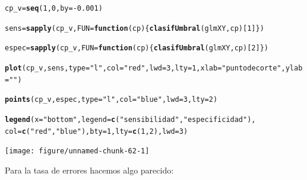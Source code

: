 \documentclass[10pt,a4paper]{article}\usepackage[]{graphicx}\usepackage[]{color}
\makeatletter
\newcommand{\hlnum}[1]{\textcolor[rgb]{0.686,0.059,0.569}{#1}}%
\newcommand{\hlstr}[1]{\textcolor[rgb]{0.192,0.494,0.8}{#1}}%
\newcommand{\hlopt}[1]{\textcolor[rgb]{0,0,0}{#1}}%
\newcommand{\hlstd}[1]{\textcolor[rgb]{0.345,0.345,0.345}{#1}}%
\newcommand{\hlkwa}[1]{\textcolor[rgb]{0.161,0.373,0.58}{\textbf{#1}}}%
\newcommand{\hlkwb}[1]{\textcolor[rgb]{0.69,0.353,0.396}{#1}}%
\newcommand{\hlkwc}[1]{\textcolor[rgb]{0.333,0.667,0.333}{#1}}%
\newcommand{\hlkwd}[1]{\textcolor[rgb]{0.737,0.353,0.396}{\textbf{#1}}}%
\newenvironment{kframe}{%
 \def\at@end@of@kframe{}%
 \ifinner\ifhmode%
  \def\at@end@of@kframe{\end{minipage}}%
  \begin{minipage}{\columnwidth}%
 \fi\fi%
 \def\FrameCommand##1{\hskip\@totalleftmargin \hskip-\fboxsep
 \colorbox{shadecolor}{##1}\hskip-\fboxsep
     \hskip-\linewidth \hskip-\@totalleftmargin \hskip\columnwidth}%
 \MakeFramed {\advance\hsize-\width
   \@totalleftmargin\z@ \linewidth\hsize
   \@setminipage}}%
 {\par\unskip\endMakeFramed%
 \at@end@of@kframe}
\newenvironment{knitrout}{}{} %
\makeatother
\begin{document}
\begin{knitrout}
\color{fgcolor}\begin{kframe}
\begin{alltt}
\hlstd{cp_v} \hlkwb{=} \hlkwd{seq}\hlstd{(}\hlnum{1}\hlstd{,} \hlnum{0}\hlstd{,} \hlkwc{by} \hlstd{=} \hlopt{-}\hlnum{0.001}\hlstd{)}

\hlstd{sens} \hlkwb{=} \hlkwd{sapply}\hlstd{(cp_v,} \hlkwc{FUN} \hlstd{=} \hlkwa{function}\hlstd{(}\hlkwc{cp}\hlstd{)\{}\hlkwd{clasifUmbral}\hlstd{(glmXY, cp)[}\hlnum{1}\hlstd{]\})}

\hlstd{espec} \hlkwb{=} \hlkwd{sapply}\hlstd{(cp_v,} \hlkwc{FUN} \hlstd{=} \hlkwa{function}\hlstd{(}\hlkwc{cp}\hlstd{)\{}\hlkwd{clasifUmbral}\hlstd{(glmXY, cp)[}\hlnum{2}\hlstd{]\})}

\hlkwd{plot}\hlstd{(cp_v, sens,} \hlkwc{type}\hlstd{=}\hlstr{"l"}\hlstd{,} \hlkwc{col}\hlstd{=}\hlstr{"red"}\hlstd{,} \hlkwc{lwd}\hlstd{=}\hlnum{3}\hlstd{,} \hlkwc{lty}\hlstd{=}\hlnum{1}\hlstd{,} \hlkwc{xlab}\hlstd{=}\hlstr{"punto de corte"}\hlstd{,} \hlkwc{ylab}\hlstd{=}\hlstr{""}\hlstd{)}

\hlkwd{points}\hlstd{(cp_v, espec,} \hlkwc{type}\hlstd{=}\hlstr{"l"}\hlstd{,} \hlkwc{col}\hlstd{=}\hlstr{"blue"}\hlstd{,} \hlkwc{lwd}\hlstd{=}\hlnum{3}\hlstd{,} \hlkwc{lty}\hlstd{=}\hlnum{2}\hlstd{)}

\hlkwd{legend}\hlstd{(}\hlkwc{x}\hlstd{=}\hlstr{"bottom"}\hlstd{,} \hlkwc{legend}\hlstd{=}\hlkwd{c}\hlstd{(}\hlstr{"sensibilidad"}\hlstd{,} \hlstr{"especificidad"}\hlstd{),}
       \hlkwc{col} \hlstd{=} \hlkwd{c}\hlstd{(}\hlstr{"red"}\hlstd{,} \hlstr{"blue"}\hlstd{),} \hlkwc{bty}\hlstd{=}\hlnum{1}\hlstd{,} \hlkwc{lty}\hlstd{=}\hlkwd{c}\hlstd{(}\hlnum{1}\hlstd{,}\hlnum{2}\hlstd{),}\hlkwc{lwd}\hlstd{=}\hlnum{3}\hlstd{)}
\end{alltt}
\end{kframe}

{\centering \texttt{[image: figure/unnamed-chunk-62-1]} 

}



\end{knitrout}

Para la tasa de errores hacemos algo parecido:
\end{document}
